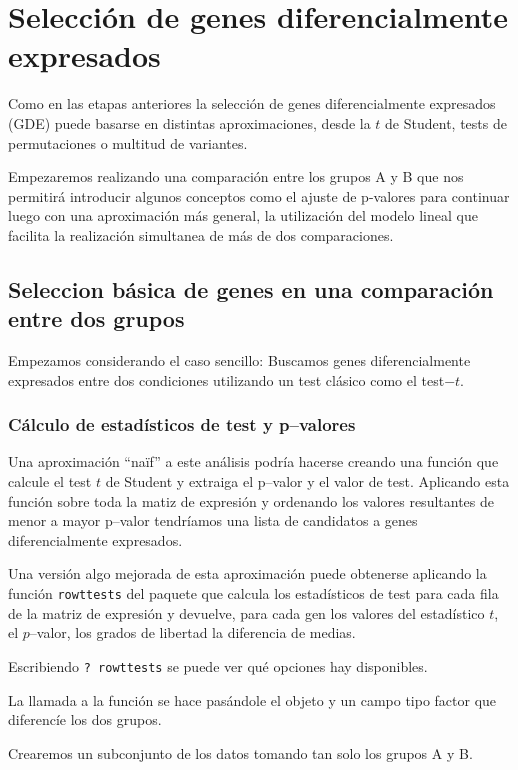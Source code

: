 \documentclass[a4paper]{article}\usepackage[]{graphicx}\usepackage[]{color}
\begin{document}
\section{Selección de genes diferencialmente expresados}

Como en las etapas anteriores la selección de genes diferencialmente expresados (GDE) puede basarse en distintas aproximaciones, desde la $t$ de Student, tests de permutaciones o multitud de variantes.

Empezaremos realizando una comparación entre los grupos A y B que nos permitirá introducir algunos conceptos como el ajuste de p-valores para continuar luego con una aproximación más general, la utilización del modelo lineal que facilita la realización simultanea de más de dos comparaciones.

\subsection{Seleccion básica de genes en una comparación entre dos grupos}

Empezamos considerando el caso sencillo: Buscamos genes diferencialmente expresados entre dos condiciones utilizando un test clásico como el test$-t$.

\subsubsection{Cálculo de estadísticos de test y p--valores}

Una aproximación ``naïf'' a este análisis podría hacerse creando una función que calcule el test $t$ de Student y extraiga el p--valor y el valor de test. Aplicando esta función sobre toda la matiz de expresión y ordenando los valores resultantes de menor a mayor p--valor tendríamos una lista de candidatos a genes diferencialmente expresados.

Una versión algo mejorada de esta aproximación puede obtenerse aplicando la función \texttt{rowttests} del paquete
  que calcula los estadísticos de test para cada fila de la matriz de expresión y devuelve, 
 para cada gen los valores del estadístico $t$, el $p$--valor, los grados de libertad  la diferencia de medias.
 
Escribiendo \texttt{? rowttests} se puede ver qué opciones hay disponibles.

La llamada a la función se hace pasándole el objeto y un campo tipo factor que diferencíe los dos grupos.

Crearemos un subconjunto de los datos tomando tan solo los grupos A y B.
\end{document}
